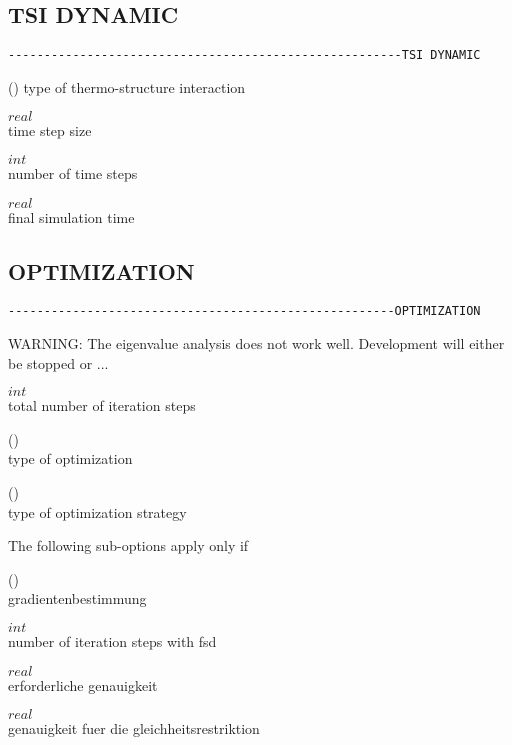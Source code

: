 \subsection{TSI DYNAMIC}
\begin{verbatim}
-------------------------------------------------------TSI DYNAMIC
\end{verbatim}

 (\kor{}\kor{})
type of thermo-structure interaction

 $real$\\
time step size

 $int$\\
number of time steps

 $real$\\
final simulation time

\subsection{OPTIMIZATION}
\begin{verbatim}
------------------------------------------------------OPTIMIZATION
\end{verbatim}

WARNING: The eigenvalue analysis does not work well. Development will either
be stopped or ...

 $int$\\
total number of iteration steps

 (\kor{})\\
type of optimization

 (\kor{})\\
type of optimization strategy

The following sub-options apply only if 

 (\kor{})\\
gradientenbestimmung

 $int$\\
number of iteration steps with fsd

 $real$\\
erforderliche genauigkeit                  

 $real$\\
genauigkeit fuer die gleichheitsrestriktion

